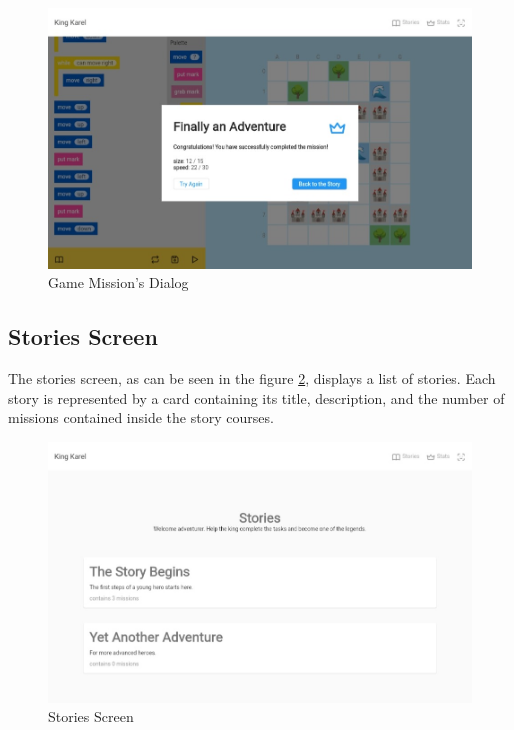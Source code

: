 \begin{figure}
    \centering
    \includegraphics[width=1\linewidth]{assets/implementation/ui/kingkarel_game_mission_dialog.jpeg}
    \caption{Game Mission's Dialog}
    \label{fig:implementation:ui:game-mission-dialog}
\end{figure}

\subsection{Stories Screen}

The stories screen, as can be seen in the figure \ref{fig:implementation:ui:stories}, displays a list of stories.
Each story is represented by a card containing its title, description, and the number of missions contained inside the story courses.

\begin{figure}
    \centering
    \includegraphics[width=1\linewidth]{assets/implementation/ui/kingkarel_stories.jpeg}
    \caption{Stories Screen}
    \label{fig:implementation:ui:stories}
\end{figure}

